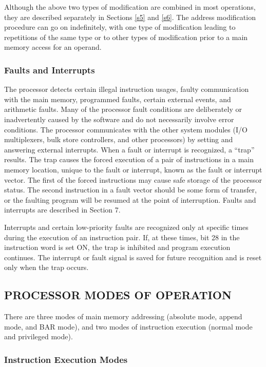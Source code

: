 Although the above two types of modification are combined in most operations,
they are described separately in Sections \ref{s5} and \ref{s6}. The address modification
procedure can go on indefinitely, with one type of modification leading to
repetitions of the same type or to other types of modification prior to a main
memory access for an operand.  

\subsubsection{Faults and Interrupts}

The processor detects certain illegal instruction usages, faulty communication
with the main memory, programmed faults, certain external events, and
arithmetic faults. Many of the processor fault conditions are deliberately or
inadvertently caused by the software and do not necessarily involve error
conditions. The processor communicates with the other system modules (I/O
multiplexers, bulk store controllers, and other processors) by setting and
answering external interrupts. When a fault or interrupt is recognized, a
{``}trap'' results. The trap causes the forced execution of a pair of
instructions in a main memory location, unique to the fault or interrupt, known
as the fault or interrupt vector. The first of the forced instructions may
cause safe storage of the processor status. The second instruction in a fault
vector should be some form of transfer, or the faulting program will be resumed
at the point of interruption. Faults and interrupts are described in Section 7.


Interrupts and certain low-priority faults are recognized only at specific
times during the execution of an instruction pair. If, at these times, bit 28
in the instruction word is set ON, the trap is inhibited and program execution
continues. The interrupt or fault signal is saved for future recognition and is
reset only when the trap occurs.


\subsection{PROCESSOR MODES OF OPERATION}


There are three modes of main memory addressing (absolute mode, append mode,
and BAR mode), and two modes of instruction execution (normal mode and
privileged mode).

\subsubsection{Instruction Execution Modes}


